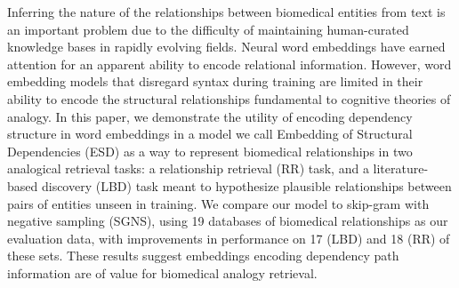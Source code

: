 Inferring the nature of the relationships between biomedical entities from text is an important problem due to the difficulty of maintaining human-curated knowledge bases in rapidly evolving fields. Neural word embeddings have earned attention for an apparent ability to encode relational information. However, word embedding models that disregard syntax during training are limited in their ability to encode the structural relationships fundamental to cognitive theories of analogy. In this paper, we demonstrate the utility of encoding dependency structure in word embeddings in a model we call Embedding of Structural Dependencies (ESD) as a way to represent biomedical relationships in two analogical retrieval tasks: a relationship retrieval (RR) task, and a literature-based discovery (LBD) task meant to hypothesize plausible relationships between pairs of entities unseen in training. We compare our model to skip-gram with negative sampling (SGNS), using 19 databases of biomedical relationships as our evaluation data, with improvements in performance on 17 (LBD) and 18 (RR) of these sets. These results suggest embeddings encoding dependency path information are of value for biomedical analogy retrieval.
